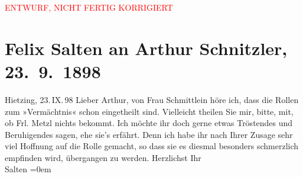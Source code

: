 
\begin{center}
            \textcolor{red}{ENTWURF, NICHT FERTIG KORRIGIERT}
                      \end{center}
            
         
         \renewcommand{\erwaehntePersonen}{Personen: Ottilie Salten, Ferdinande Schmittlein}
         \renewcommand{\erwaehnteOrte}{Orte: Wien, XIII., Hietzing}
         \renewcommand{\erwaehnteWerke}{Werke: Das Vermächtnis. Schauspiel in drei Akten}
               \section[Felix Salten an Arthur Schnitzler, 23. 9. 1898]{ Felix Salten an Arthur Schnitzler, 23. 9. 1898}\nopagebreak{}\rehead{ }\begin{ledgroupsized}[t]{13cm}\normalsize\beginnumbering \toendnotes[C]{\smallbreak\pagebreak[2]} 
\pstart
           \raggedleft{}{\pb}Hietzing, 23. IX. 98\pend
           \pstart{}Lieber Arthur,\pend\pstart
           von Frau Schmittlein höre ich, dass die Rollen
               zum »Vermächtnis« schon eingetheilt sind.
               Vielleicht theilen Sie mir, bitte, mit, ob Frl. Metzl nichts bekommt. Ich möchte ihr doch gerne etwas Tröstendes und
               Beruhigendes sagen, ehe sie’s erfährt. Denn ich habe ihr nach Ihrer Zusage sehr viel
               Hoffnung auf die Rolle gemacht, so dass  sie es
               diesmal besonders schmerzlich empfinden wird, übergangen zu werden.\pend
           \pstart
           Herzlichst Ihr {\\[\baselineskip]}\spacefill\mbox{Salten}\pend
           \leftskip=0em{}
         
         \endnumbering{}\end{ledgroupsized}\begin{anhang}\end{anhang}\newcommand{\dateiname}{L03284}\newcommand{\titel}{Felix Salten an Arthur Schnitzler, 23. 9. 1898}\newcommand{\editorInnen}{Martin Anton Müller und Laura Untner}
      